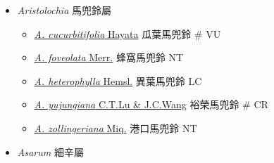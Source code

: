 
  \begin{itemize}
 \item[] \textit{Aristolochia} 馬兜鈴屬
                                
  \begin{itemize}
        \item[] \href{http://www.theplantlist.org/tpl1.1/search?q=Aristolochia+cucurbitifolia}{\textit{A. cucurbitifolia} Hayata}   瓜葉馬兜鈴  \# VU
        \item[] \href{http://www.theplantlist.org/tpl1.1/search?q=Aristolochia+foveolata}{\textit{A. foveolata} Merr.}   蜂窩馬兜鈴   NT
        \item[] \href{http://www.theplantlist.org/tpl1.1/search?q=Aristolochia+heterophylla}{\textit{A. heterophylla} Hemsl.}   異葉馬兜鈴   LC
        \item[] \href{http://www.theplantlist.org/tpl1.1/search?q=Aristolochia+yujungiana}{\textit{A. yujungiana} C.T.Lu \& J.C.Wang}   裕榮馬兜鈴  \# CR
        \item[] \href{http://www.theplantlist.org/tpl1.1/search?q=Aristolochia+zollingeriana}{\textit{A. zollingeriana} Miq.}   港口馬兜鈴   NT
  \end{itemize}
 \item[] \textit{Asarum} 細辛屬
                                

\end{itemize}
